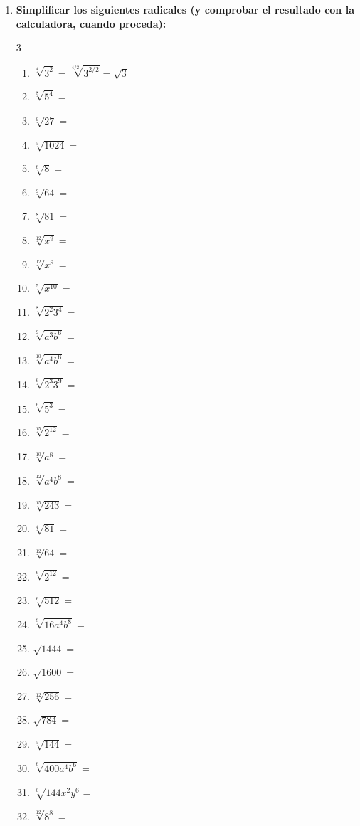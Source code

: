 \documentclass[a4paper,12pt]{article}
\begin{document}
\begin{enumerate}
    \item \textbf{Simplificar los siguientes radicales (y comprobar el resultado con la calculadora, cuando proceda):}
    \begin{multicols}{3}
    \begin{enumerate}[label=\arabic*)]
        \item $\sqrt[4]{3^2} = \sqrt[4/2]{3^{2/2}} = \sqrt{3}$
        \item $\sqrt[8]{5^4} =$
        \item $\sqrt[9]{27} =$
        \item $\sqrt[5]{1024} =$
        \item $\sqrt[6]{8} =$
        \item $\sqrt[9]{64} =$
        \item $\sqrt[8]{81} =$
        \item $\sqrt[12]{x^9} =$
        \item $\sqrt[12]{x^8} =$
        \item $\sqrt[5]{x^{10}} =$
        \item $\sqrt[8]{2^2 3^4} =$
        \item $\sqrt[9]{a^3 b^6} =$
        \item $\sqrt[10]{a^4 b^6} =$
        \item $\sqrt[6]{2^3 3^9} =$
        \item $\sqrt[6]{5^3} =$
        \item $\sqrt[15]{2^{12}} =$
        \item $\sqrt[10]{a^8} =$
        \item $\sqrt[12]{a^4 b^8} =$
        \item $\sqrt[15]{243} =$
        \item $\sqrt[4]{81} =$
        \item $\sqrt[12]{64} =$
        \item $\sqrt[6]{2^{12}} =$
        \item $\sqrt[6]{512} =$
        \item $\sqrt[8]{16 a^4 b^8} =$
        \item $\sqrt{1444} =$
        \item $\sqrt{1600} =$
        \item $\sqrt[12]{256} =$
        \item $\sqrt{784} =$
        \item $\sqrt[5]{144} =$
        \item $\sqrt[6]{400 a^4 b^6} =$
        \item $\sqrt[6]{144 x^2 y^6} =$
        \item $\sqrt[12]{8^8} =$
    \end{enumerate}
    \end{multicols}


\end{enumerate}
\end{document}
